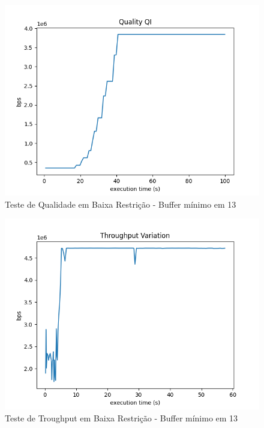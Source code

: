 \documentclass[10pt,twocolumn,letterpaper]{article}
\begin{document}
\begin{figure}
	\centering
	\includegraphics[width=\linewidth]{playback_quality_qi.png}
	\caption{Teste de Qualidade em Baixa Restrição - Buffer mínimo em 13}
	\label{fig:7}
\end{figure}
\begin{figure}
	\centering
	\includegraphics[width=\linewidth]{throughput.png}
	\caption{Teste de Troughput em Baixa Restrição - Buffer mínimo em 13}
	\label{fig:8}
\end{figure}
\end{document}
